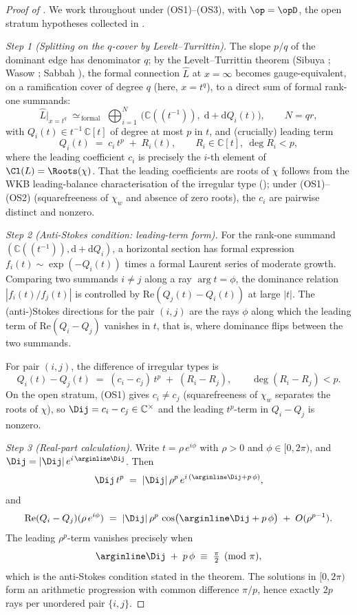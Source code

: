 \begin{proof}[Proof of ]
We work throughout under (OS1)--(OS3), with $\op = \opD$, the open
stratum hypotheses collected in .

\smallskip
\textit{Step 1 (Splitting on the $q$-cover by Levelt--Turrittin).}
The slope $p/q$ of the dominant edge has denominator $q$; by the
Levelt--Turrittin theorem (Sibuya \cite{sibuya}; Wasow
\cite[Ch.~VII, Thms.~19.1, 19.2]{wasow}; Sabbah
\cite[Ch.~II, Thm.~II.2.4]{sabbah-isomon}), the formal connection
$\widehat{L}$ at $x = \infty$ becomes gauge-equivalent, on a
ramification cover of degree $q$ (here, $x = t^q$), to a direct sum
of formal rank-one summands:
\[
   \widehat{L}\big|_{x = t^q}
   \;\simeq_{\,\mathrm{formal}}\;
   \bigoplus_{i = 1}^{N}\,
   \big(\mathbb{C}((t^{-1})),\; \mathrm{d} + \mathrm{d} Q_i(t)\big),
   \qquad N = qr,
\]
with $Q_i(t) \in t^{-1}\, \mathbb{C}[t]$ of degree at most $p$ in $t$,
and (crucially) leading term
\[
   Q_i(t) \;=\; c_i\, t^p \;+\; R_i(t),
   \qquad
   R_i \in \mathbb{C}[t],\ \deg R_i < p,
\]
where the leading coefficient $c_i$ is precisely the $i$-th element
of $\Cl(L) = \Roots(\chi)$. That the leading coefficients are roots
of $\chi$ follows from the WKB leading-balance characterisation of
the irregular type (\cite[Ch.~II, \S 1.3]{sabbah-isomon}); under
(OS1)--(OS2) (squarefreeness of $\chi_w$ and absence of zero roots),
the $c_i$ are pairwise distinct and nonzero.

\smallskip
\textit{Step 2 (Anti-Stokes condition: leading-term form).}
For the rank-one summand $(\mathbb{C}((t^{-1})), \mathrm{d} +
\mathrm{d} Q_i)$, a horizontal section has formal expression
$f_i(t) \sim \exp(-Q_i(t))$ times a formal Laurent series of moderate
growth. Comparing two summands $i \ne j$ along a ray $\arg t = \phi$,
the dominance relation $|f_i(t)/f_j(t)|$ is controlled by
$\mathrm{Re}(Q_j(t) - Q_i(t))$ at large $|t|$. The (anti-)Stokes
directions for the pair $(i, j)$ are the rays $\phi$ along which the
leading term of $\mathrm{Re}(Q_i - Q_j)$ vanishes in $t$, that is,
where dominance flips between the two summands.

For pair $(i, j)$, the difference of irregular types is
\[
   Q_i(t) - Q_j(t) \;=\; (c_i - c_j)\, t^p \;+\; (R_i - R_j),
   \qquad \deg(R_i - R_j) < p.
\]
On the open stratum, (OS1) gives $c_i \ne c_j$ (squarefreeness of
$\chi_w$ separates the roots of $\chi$), so $\Dij = c_i - c_j \in
\mathbb{C}^\times$ and the leading $t^p$-term in $Q_i - Q_j$ is
nonzero.

\smallskip
\textit{Step 3 (Real-part calculation).}
Write $t = \rho\, e^{i\phi}$ with $\rho > 0$ and $\phi \in
[0, 2\pi)$, and $\Dij = |\Dij|\, e^{i\, \arginline \Dij}$. Then
\[
   \Dij\, t^p \;=\; |\Dij|\, \rho^p\, e^{i\, (\arginline \Dij + p\, \phi)},
\]
and
\[
   \mathrm{Re}(Q_i - Q_j)(\rho\, e^{i\phi})
   \;=\;
   |\Dij|\, \rho^p\, \cos\!\big(\arginline \Dij + p\, \phi\big)
   \;+\; O(\rho^{p-1}).
\]
The leading $\rho^p$-term vanishes precisely when
\[
   \arginline \Dij \;+\; p\, \phi \;\equiv\;
   \tfrac{\pi}{2} \pmod{\pi},
\]
which is the anti-Stokes condition stated in the theorem. The
solutions in $[0, 2\pi)$ form an arithmetic progression with
common difference $\pi / p$, hence exactly $2p$ rays per
unordered pair $\{i, j\}$.


\end{proof}
